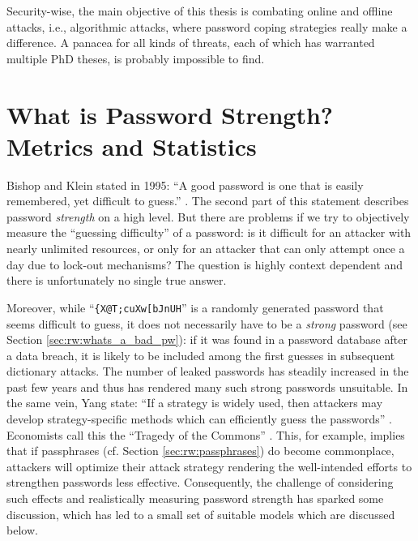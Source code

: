 Security-wise, the main objective of this thesis is combating online and offline attacks, i.e., algorithmic attacks, where password coping strategies really make a difference. A panacea for all kinds of threats, each of which has warranted multiple PhD theses, is probably impossible to find. 


\section{What is Password Strength? Metrics and Statistics}\label{sec:rw:pw_strength_metrics}
Bishop and Klein stated in 1995: ``A good password is one that is easily remembered, yet difficult to guess.'' \cite[p. 231]{Bishop1995ProactivePasswordChecking}. The second part of this statement describes password \textit{strength} on a high level. But there are problems if we try to objectively measure the ``guessing difficulty'' of a password: is it difficult for an attacker with nearly unlimited resources, or only for an attacker that can only attempt once a day due to lock-out mechanisms? The question is highly context dependent and there is unfortunately no single true answer. 

Moreover, while ``\texttt{\{X@T;cuXw[bJnUH}'' is a randomly generated password that seems difficult to guess, it does not necessarily have to be a \textit{strong} password (see Section \ref{sec:rw:whats_a_bad_pw}): if it was found in a password database after a data breach, it is likely to be included among the first guesses in subsequent dictionary attacks. The number of leaked passwords has steadily increased in the past few years and thus has rendered many such strong passwords unsuitable. In the same vein, Yang \etal state: ``If a strategy is widely used, then attackers may develop strategy-specific methods which can efficiently guess the passwords'' \cite{Yang2016MnemonicSentenceBased}. Economists call this the ``Tragedy of the Commons'' \cite{Hardin1968TragedyCommons}. This, for example, implies that if passphrases (cf. Section \ref{sec:rw:passphrases}) do become commonplace, attackers will optimize their attack strategy rendering the well-intended efforts to strengthen passwords less effective. Consequently, the challenge of considering such effects and realistically measuring password strength has sparked some discussion, which has led to a small set of suitable models which are discussed below.



